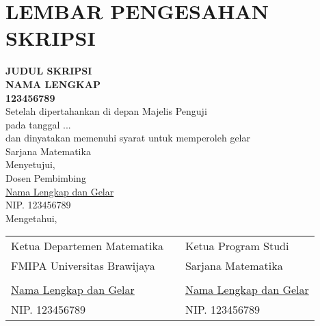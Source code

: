 \chapter*{LEMBAR PENGESAHAN SKRIPSI}
\begin{center}
	\vspace{1cm}
	\textbf{JUDUL SKRIPSI}\\
	\vspace{1cm}
	\textbf{NAMA LENGKAP}\\
	\textbf{123456789}\\
	\vspace{1cm}
	Setelah dipertahankan di depan Majelis Penguji \\pada tanggal ... \\ dan dinyatakan memenuhi syarat untuk memperoleh gelar\\ Sarjana  Matematika\\
	\vspace{1cm}
	Menyetujui,\\
	Dosen Pembimbing\\
	\vspace{2cm}
	\underline{Nama Lengkap dan Gelar}\\
	NIP. 123456789\\
	\vfill
	Mengetahui,
\end{center}
\begin{tabular}{p{5cm}cp{5cm}}
        Ketua Departemen Matematika & & Ketua Program Studi \\
	    FMIPA Universitas Brawijaya & & Sarjana Matematika\\
	    \vspace{1.5cm} & & \vspace{1.5cm}\\
	    \underline{Nama Lengkap dan Gelar}& & \underline{Nama Lengkap dan Gelar}\\
	    NIP. 123456789 & & NIP. 123456789
    \end{tabular}
\cleardoublepage

